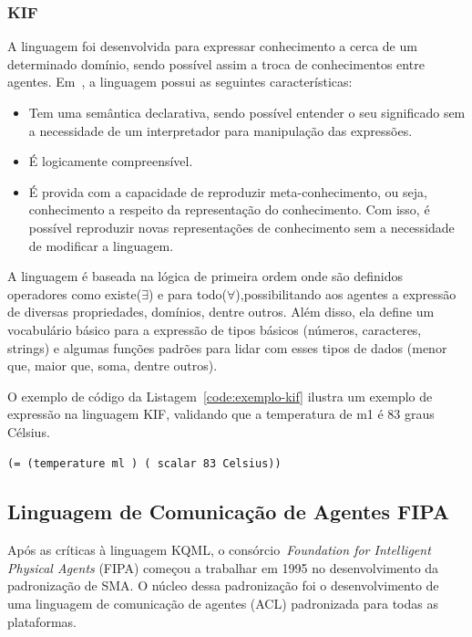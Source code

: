 \subsubsection{KIF}
A linguagem foi desenvolvida para expressar conhecimento a cerca de um determinado domínio, sendo possível assim a troca de conhecimentos entre agentes. Em~\cite{kifmanual}, a linguagem possui as seguintes características:
\begin{itemize}
	\item Tem uma semântica declarativa, sendo possível entender o seu significado sem a necessidade de um interpretador para manipulação das expressões.
	\item É logicamente compreensível.
	\item É provida com a capacidade de reproduzir meta-conhecimento, ou seja, conhecimento a respeito da representação do conhecimento. Com isso, é possível reproduzir novas representações de conhecimento sem a necessidade de modificar a linguagem.
\end{itemize}

A linguagem é baseada na lógica de primeira ordem onde são definidos operadores como existe($\exists$) e para todo($\forall$),possibilitando aos agentes a expressão de diversas propriedades, domínios, dentre outros. Além disso, ela define um vocabulário básico para a expressão de tipos básicos (números, caracteres, strings) e algumas funções padrões para lidar com esses tipos de dados (menor que, maior que, soma, dentre outros). 

O exemplo de código da Listagem~\ref{code:exemplo-kif} ilustra um exemplo de expressão na linguagem KIF, validando que a temperatura de m1 é 83 graus Célsius.

\begin{lstlisting}[label=code:exemplo-kif,caption=Exemplo de expressão de conteúdo com a linguagem KIF. Fonte:~\cite{wooldridge04}]
(= (temperature ml ) ( scalar 83 Celsius))
\end{lstlisting}

\subsection{Linguagem de Comunicação de Agentes FIPA}

Após as críticas à linguagem KQML, o consórcio~\emph{Foundation for Intelligent Physical Agents} (FIPA) começou a trabalhar em 1995 no desenvolvimento da padronização de SMA. O núcleo dessa padronização foi o desenvolvimento de uma linguagem de comunicação de agentes (ACL) padronizada para todas as plataformas.

